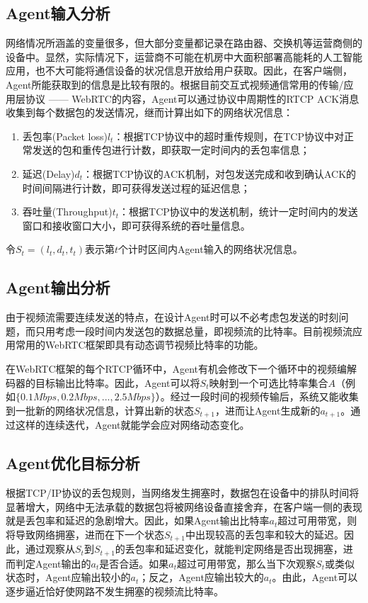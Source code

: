 \documentclass[a4paper]{ctexart}
\begin{document}
\subsection{Agent输入分析}

网络情况所涵盖的变量很多，但大部分变量都记录在路由器、交换机等运营商侧的设备中。显然，实际情况下，运营商不可能在机房中大面积部署高能耗的人工智能应用，也不大可能将通信设备的状况信息开放给用户获取。因此，在客户端侧，Agent所能获取到的信息是比较有限的。根据目前交互式视频通信常用的传输/应用层协议 —— WebRTC的内容，Agent可以通过协议中周期性的RTCP ACK消息收集到每个数据包的发送情况，继而计算出如下的网络状况信息：

\begin{enumerate}[label=\arabic*、]
	\item 丢包率(Packet loss)$l_t$：根据TCP协议中的超时重传规则，在TCP协议中对正常发送的包和重传包进行计数，即获取一定时间内的丢包率信息；
	\item 延迟(Delay)$d_t$：根据TCP协议的ACK机制，对包发送完成和收到确认ACK的时间间隔进行计数，即可获得发送过程的延迟信息；
	\item 吞吐量(Throughput)$t_t$：根据TCP协议中的发送机制，统计一定时间内的发送窗口和接收窗口大小，即可获得系统的吞吐量信息。
\end{enumerate}

令$S_t=(l_t, d_t, t_t)$表示第$t$个计时区间内Agent输入的网络状况信息。

\subsection{Agent输出分析}

由于视频流需要连续发送的特点，在设计Agent时可以不必考虑包发送的时刻问题，而只用考虑一段时间内发送包的数据总量，即视频流的比特率。目前视频流应用常用的WebRTC框架即具有动态调节视频比特率的功能。

在WebRTC框架的每个RTCP循环中，Agent有机会修改下一个循环中的视频编解码器的目标输出比特率。因此，Agent可以将$S_t$映射到一个可选比特率集合$A$（例如$\{0.1Mbps,0.2Mbps,...,2.5Mbps\}$）。经过一段时间的视频传输后，系统又能收集到一批新的网络状况信息，计算出新的状态$S_{t+1}$，进而让Agent生成新的$a_{t+1}$。通过这样的连续迭代，Agent就能学会应对网络动态变化。

\subsection{Agent优化目标分析}\label{sec:Agent优化目标分析}

根据TCP/IP协议的丢包规则，当网络发生拥塞时，数据包在设备中的排队时间将显著增大，网络中无法承载的数据包将被网络设备直接舍弃，在客户端一侧的表现就是丢包率和延迟的急剧增大。因此，如果Agent输出比特率$a_t$超过可用带宽，则将导致网络拥塞，进而在下一个状态$S_{t+1}$中出现较高的丢包率和较大的延迟。因此，通过观察从$S_t$到$S_{t+1}$的丢包率和延迟变化，就能判定网络是否出现拥塞，进而判定Agent输出的$a_t$是否合适。如果$a_t$超过可用带宽，那么当下次观察$S_t$或类似状态时，Agent应输出较小的$a_t$；反之，Agent应输出较大的$a_t$。由此，Agent可以逐步逼近恰好使网路不发生拥塞的视频流比特率。
\end{document}
